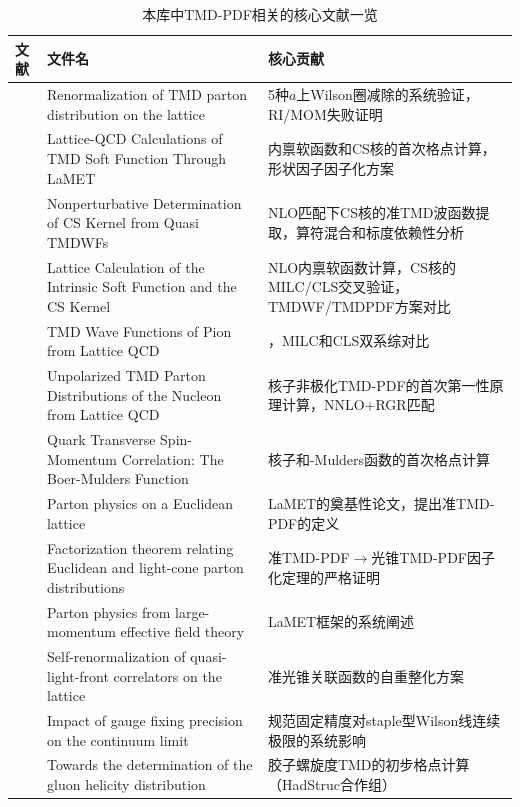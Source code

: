 \documentclass[12pt,a4paper]{ctexart}
\theoremstyle{definition}
\begin{document}
\begin{table}[H]
\centering
\caption{本库中TMD-PDF相关的核心文献一览}
\label{tab:TMD_papers}
\small
\begin{tabular}{lp{5cm}l}
\toprule
文献 & 文件名 & 核心贡献 \\
\midrule
\cite{Zhang2022renormTMD} & Renormalization of TMD parton distribution on the lattice &
5种$a$上Wilson圈减除的系统验证，RI/MOM失败证明 \\

\cite{LPC2020soft} & Lattice-QCD Calculations of TMD Soft Function Through LaMET &
内禀软函数和CS核的首次格点计算，形状因子因子化方案 \\

\cite{Chu2022CSkernel} & Nonperturbative Determination of CS Kernel from Quasi TMDWFs &
NLO匹配下CS核的准TMD波函数提取，算符混合和标度依赖性分析 \\

\cite{Chu2023soft} & Lattice Calculation of the Intrinsic Soft Function and the CS Kernel &
NLO内禀软函数计算，CS核的MILC/CLS交叉验证，TMDWF/TMDPDF方案对比 \\

\cite{Chu2023TMDWF} & TMD Wave Functions of Pion from Lattice QCD &
，MILC和CLS双系综对比 \\

\cite{He2024unpolTMD} & Unpolarized TMD Parton Distributions of the Nucleon from Lattice QCD &
核子非极化TMD-PDF的首次第一性原理计算，NNLO+RGR匹配 \\

\cite{Ma2025BoerMulders} & Quark Transverse Spin-Momentum Correlation: The Boer-Mulders Function &
核子和-Mulders函数的首次格点计算 \\

\cite{Ji2013Euclidean} & Parton physics on a Euclidean lattice &
LaMET的奠基性论文，提出准TMD-PDF的定义 \\

\cite{Izubuchi2018} & Factorization theorem relating Euclidean and light-cone parton distributions &
准TMD-PDF$\to$光锥TMD-PDF因子化定理的严格证明 \\

\cite{Ji2014LaMET} & Parton physics from large-momentum effective field theory &
LaMET框架的系统阐述 \\

\cite{Huo2021self} & Self-renormalization of quasi-light-front correlators on the lattice &
准光锥关联函数的自重整化方案 \\

\cite{Zhang2024gauge_fixing} & Impact of gauge fixing precision on the continuum limit &
规范固定精度对staple型Wilson线连续极限的系统影响 \\

\cite{Egerer2022} & Towards the determination of the gluon helicity distribution &
胶子螺旋度TMD的初步格点计算（HadStruc合作组）\\
\bottomrule
\end{tabular}
\end{table}
\end{document}
